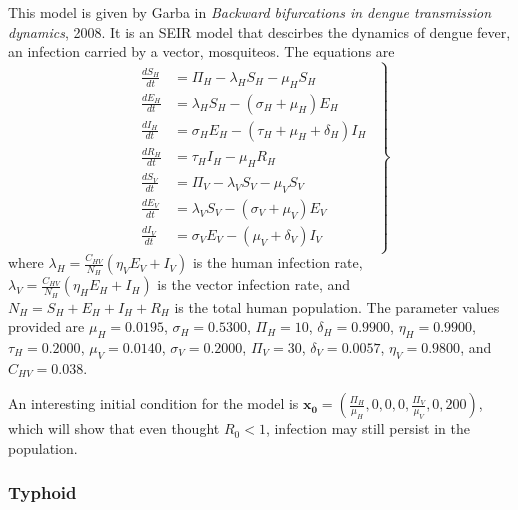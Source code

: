 \documentclass[12pt]{article}
\begin{document}
This model is given by Garba in \textit{Backward bifurcations in dengue transmission dynamics}, 2008.  It is an SEIR model that descirbes the dynamics of dengue fever, an infection carried by a vector, mosquiteos.  The equations are
%
\begin{equation*}\label{eq:dengue}
\left. \begin{gathered} \begin{aligned}
\frac{dS_H}{dt} &= \Pi_H-\lambda_HS_H-\mu_HS_H\\
\frac{dE_H}{dt} &= \lambda_HS_H-(\sigma_H+\mu_H)E_H\\
\frac{dI_H}{dt} &= \sigma_HE_H-(\tau_H+\mu_H+\delta_H)I_H\\
\frac{dR_H}{dt} &= \tau_HI_H-\mu_HR_H\\
\frac{dS_V}{dt} &= \Pi_V-\lambda_VS_V-\mu_VS_V\\
\frac{dE_V}{dt} &= \lambda_VS_V-(\sigma_V+\mu_V)E_V\\
\frac{dI_V}{dt} &= \sigma_VE_V-(\mu_V+\delta_V)I_V
\end{aligned} \end{gathered}\right \}
\end{equation*}
%
where $\lambda_H = \frac{C_{HV}}{N_H}(\eta_VE_V+I_V)$ is the human infection rate, $\lambda_V = \frac{C_{HV}}{N_H}(\eta_HE_H+I_H)$ is the vector infection rate, and $N_H = S_H+E_H+I_H+R_H$ is the total human population.  The parameter values provided are $\mu_H=0.0195$, $\sigma_H=0.5300$, $\Pi_H=10$, $\delta_H=0.9900$, $\eta_H=0.9900$, $\tau_H=0.2000$, $\mu_V=0.0140$, $\sigma_V = 0.2000$, $\Pi_V = 30$, $\delta_V = 0.0057$, $\eta_V=0.9800$, and
$C_{HV} = 0.038$.

An interesting initial condition for the model is $\textbf{x}_\textbf{0} = (\frac{\Pi_H}{\mu_H}, 0, 0, 0, \frac{\Pi_V}{\mu_V}, 0, 200)$, which will show that even thought $R_0 <1$, infection may still persist in the population.

\subsubsection{Typhoid}
\end{document}
